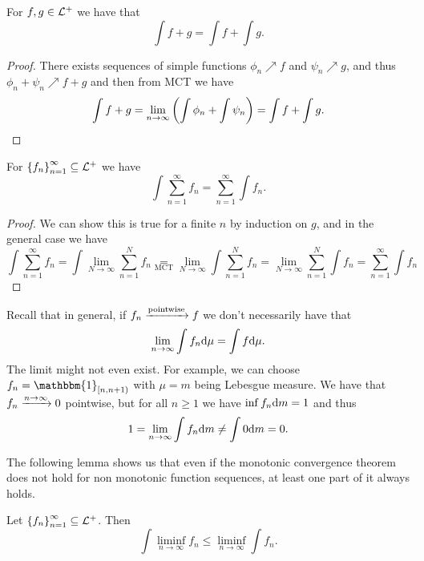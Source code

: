 \documentclass[11pt,a4paper]{article}
\begin{document}
\begin{corollary}
  For $f,g \in \mathcal{L}^+$ we have that
  \[
    \int f + g =
    \int f + \int g.
  \]
\end{corollary}
\begin{proof}
  There exists sequences of simple functions $\phi_n \nearrow f$ and 
  $\psi_n \nearrow g$, and thus $\phi_n + \psi_n \nearrow f + g$
  and then from MCT we have
  \[
    \int f + g =
    \lim_{n \to \infty}\del{\int \phi_n + \int \psi_n} =
    \int f + \int g.
  \]
\end{proof}

\begin{corollary}
  For $\left\{f_n\right\}_{n=1}^{\infty} \subseteq \mathcal{L}^+$ we have
  \[
    \int \sum_{n=1}^{\infty} f_n =
    \sum_{n=1}^{\infty} \int f_n.
  \]
\end{corollary}
\begin{proof}
  We can show this is true for a finite $n$ by induction on $g$,
  and in the general case we have
  \[
    \int \sum_{n=1}^{\infty} f_n =
    \int \lim_{N \to \infty} \sum_{n=1}^{N} f_n 
    \underset{\text{MCT}}{=}
    \lim_{N \to \infty} \int \sum_{n=1}^{N} f_n =
    \lim_{N \to \infty} \sum_{n=1}^{N} \int f_n =
    \sum_{n=1}^{\infty} \int f_n
  \]
\end{proof}

\begin{remark}
  Recall that in general, if $f_n \xrightarrow{\text{pointwise}} f$ we don't
  necessarily have that
  \[
    \lim_{n \to \infty} \int f_n \mathrm{d} \mu = \int f \mathrm{d} \mu.
  \]
  The limit might not even exist.
  For example, we can choose $f_n = \mathbbm{1}_{[n,n+1)}$ with $\mu = m$
  being Lebesgue measure.
  We have that $f_n \xrightarrow{n \to \infty} 0$ pointwise,
  but for all $n \geq 1$ we have $\inf f_n \mathrm{d} m = 1$ and thus
  \[
    1 = \lim_{n \to \infty} \int f_n \mathrm{d} m \neq
    \int 0 \mathrm{d} m = 0.
  \]
\end{remark}


\begin{remark}
  The following lemma shows us that even if the monotonic convergence theorem
  does not hold for non monotonic function sequences,
  at least one part of it always holds.
\end{remark}

\begin{lemma}
  Let $\left\{f_n\right\}_{n=1}^{\infty} \subseteq \mathcal{L}^+$.
  Then
  \[
    \int \liminf_{n \to \infty} f_n \le
    \liminf_{n \to \infty} \int f_n.
  \]
\end{lemma}
\end{document}
